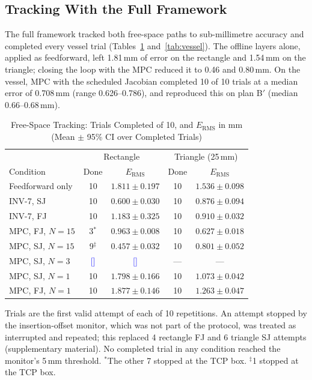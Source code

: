 \documentclass[journal]{IEEEtran}
\newcommand{\NEWRUN}[1]{\textcolor{blue}{[#1]}}
\begin{document}
\subsection{Tracking With the Full Framework}
\label{sec:res-track}

The full framework tracked both free-space paths to sub-millimetre
accuracy and completed every vessel trial (Tables~\ref{tab:shape}
and~\ref{tab:vessel}). The offline layers alone, applied as feedforward,
left 1.81\,mm of error on the rectangle and 1.54\,mm on the triangle;
closing the loop with the MPC reduced it to 0.46 and 0.80\,mm.
On the vessel, MPC with the scheduled Jacobian
completed 10 of 10 trials at a median error of 0.708\,mm (range
0.626--0.786), and reproduced this on plan B$'$ (median 0.66--0.68\,mm).

\begin{table}[t]
\centering
\caption{Free-Space Tracking: Trials Completed of 10, and $E_{\mathrm{RMS}}$
in mm (Mean $\pm$ 95\% CI over Completed Trials)}
\label{tab:shape}
\footnotesize
\setlength{\tabcolsep}{2.5pt}
\begin{tabular}{@{}lcccc@{}}
\toprule
 & \multicolumn{2}{c}{Rectangle} & \multicolumn{2}{c}{Triangle (25\,mm)} \\
Condition & Done & $E_{\mathrm{RMS}}$ & Done & $E_{\mathrm{RMS}}$ \\
\midrule
Feedforward only   & 10 & $1.811\pm0.197$ & 10 & $1.536\pm0.098$ \\
INV-7, SJ          & 10 & $0.600\pm0.030$ & 10 & $0.876\pm0.094$ \\
INV-7, FJ          & 10 & $1.183\pm0.325$ & 10 & $0.910\pm0.032$ \\
MPC, FJ, $N=15$    & 3$^\ast$ & $0.963\pm0.008$ & 10 & $0.627\pm0.018$ \\
MPC, SJ, $N=15$    & 9$^\ddagger$ & $0.457\pm0.032$ & 10 & $0.801\pm0.052$ \\
MPC, SJ, $N=3$     & \NEWRUN{} & \NEWRUN{} & --- & --- \\
MPC, SJ, $N=1$     & 10 & $1.798\pm0.166$ & 10 & $1.073\pm0.042$ \\
MPC, FJ, $N=1$     & 10 & $1.877\pm0.146$ & 10 & $1.263\pm0.047$ \\
\bottomrule
\end{tabular}

\vspace{2pt}
\parbox{\columnwidth}{\scriptsize Trials are the first valid attempt of
each of 10 repetitions. An attempt stopped by the insertion-offset
monitor, which was not part of the protocol, was treated as interrupted
and repeated; this replaced 4 rectangle FJ and 6 triangle SJ attempts
(supplementary material). No completed trial in any condition reached the
monitor's 5\,mm threshold. $^\ast$The other 7 stopped at the TCP box.
$^\ddagger$1 stopped at the TCP box.}
\end{table}
\end{document}
